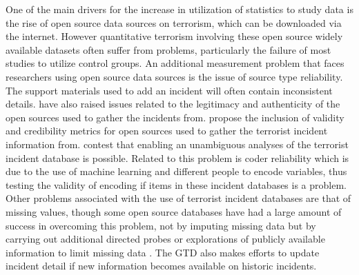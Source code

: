 One of the main drivers for the increase in utilization of statistics to study data is the rise of open source data sources on terrorism, which can be downloaded via the internet. However quantitative terrorism involving these open source widely available datasets often suffer from problems, particularly the failure of most studies to utilize control groups. An additional measurement problem that faces researchers using open source data sources is the issue of source type reliability. The support materials used to add an incident will often contain inconsistent details. \citep{ackerman2016speaking} have also raised issues related to the legitimacy and authenticity of the open sources used to gather the incidents from. \citep{ackerman2016speaking} propose the inclusion of validity and credibility metrics for  open sources used to gather the terrorist incident information from. \citep{ackerman2016speaking} contest that enabling  an unambiguous analyses of the terrorist incident database is possible. Related to this problem is coder reliability which is due to the use of machine learning and different people to encode variables, thus testing the validity of encoding if items in these incident databases is a problem. 
Other problems associated with the use of terrorist incident databases are that of missing values, though some open source databases have had a large amount of success in overcoming this problem, not by imputing missing data but by carrying out additional directed  probes or explorations of publicly available information to limit missing data \citep{parkin2012developing}. The GTD also makes efforts to update incident detail if new information becomes available on historic incidents.


